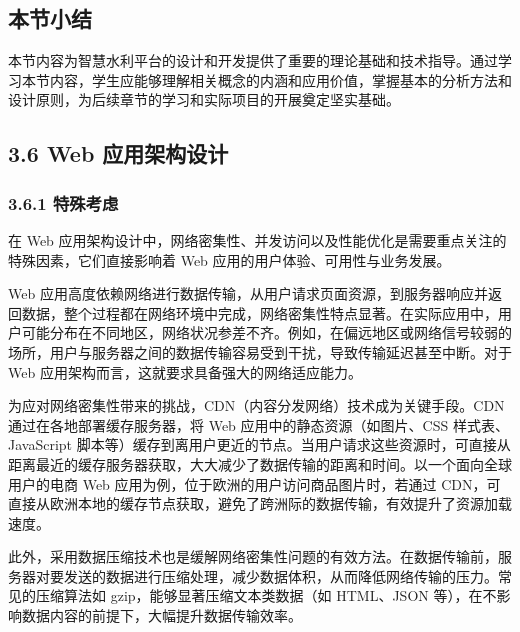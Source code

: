 \hypertarget{ux672cux8282ux5c0fux7ed3-1}{%
\subsection{本节小结}\label{ux672cux8282ux5c0fux7ed3-1}}

本节内容为智慧水利平台的设计和开发提供了重要的理论基础和技术指导。通过学习本节内容，学生应能够理解相关概念的内涵和应用价值，掌握基本的分析方法和设计原则，为后续章节的学习和实际项目的开展奠定坚实基础。

\hypertarget{web-ux5e94ux7528ux67b6ux6784ux8bbeux8ba1}{%
\subsection{3.6 Web 应用架构设计}\label{web-ux5e94ux7528ux67b6ux6784ux8bbeux8ba1}}

\hypertarget{ux7279ux6b8aux8003ux8651}{%
\subsubsection{3.6.1 特殊考虑}\label{ux7279ux6b8aux8003ux8651}}

在 Web 应用架构设计中，网络密集性、并发访问以及性能优化是需要重点关注的特殊因素，它们直接影响着 Web 应用的用户体验、可用性与业务发展。


Web 应用高度依赖网络进行数据传输，从用户请求页面资源，到服务器响应并返回数据，整个过程都在网络环境中完成，网络密集性特点显著。在实际应用中，用户可能分布在不同地区，网络状况参差不齐。例如，在偏远地区或网络信号较弱的场所，用户与服务器之间的数据传输容易受到干扰，导致传输延迟甚至中断。对于 Web 应用架构而言，这就要求具备强大的网络适应能力。

为应对网络密集性带来的挑战，CDN（内容分发网络）技术成为关键手段。CDN 通过在各地部署缓存服务器，将 Web 应用中的静态资源（如图片、CSS 样式表、JavaScript 脚本等）缓存到离用户更近的节点。当用户请求这些资源时，可直接从距离最近的缓存服务器获取，大大减少了数据传输的距离和时间。以一个面向全球用户的电商 Web 应用为例，位于欧洲的用户访问商品图片时，若通过 CDN，可直接从欧洲本地的缓存节点获取，避免了跨洲际的数据传输，有效提升了资源加载速度。

此外，采用数据压缩技术也是缓解网络密集性问题的有效方法。在数据传输前，服务器对要发送的数据进行压缩处理，减少数据体积，从而降低网络传输的压力。常见的压缩算法如 gzip，能够显著压缩文本类数据（如 HTML、JSON 等），在不影响数据内容的前提下，大幅提升数据传输效率。



